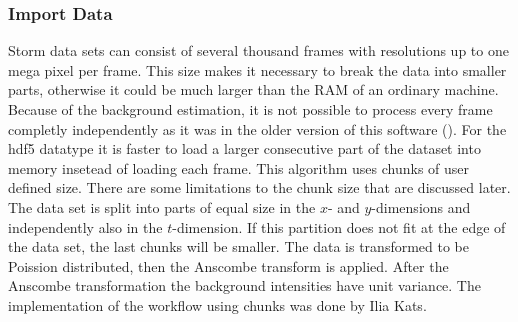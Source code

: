 \subsubsection{Import Data}
Storm data sets can consist of several thousand frames with resolutions up to one mega pixel per frame. This size makes it necessary to break the data into smaller parts, otherwise it could be much larger than the RAM of an ordinary machine. Because of the background estimation, it is not possible to process every frame completly independently as it was in the older version of this software (\cite{MAJoachim}). For the hdf5 datatype it is faster to load a larger consecutive part of the dataset into memory insetead of loading each frame.\newline
This algorithm uses chunks of user defined size. There are some limitations to the chunk size that are discussed later. The data set is split into parts of equal size in the $x$- and $y$-dimensions and independently also in the $t$-dimension. If this partition does not fit at the edge of the data set, the last chunks will be smaller.\newline
The data is transformed to be Poission distributed, then the Anscombe transform is applied. After the Anscombe transformation the background intensities have unit variance.\newline
The implementation of the workflow using chunks was done by Ilia Kats.
